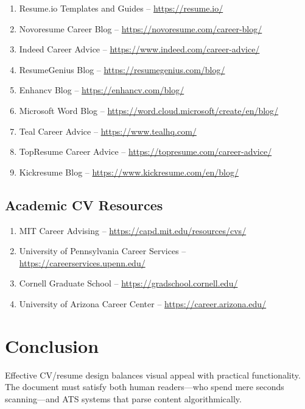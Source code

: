 \documentclass[11pt,a4paper]{article}
\begin{document}
\begin{enumerate}
    \item Resume.io Templates and Guides -- \url{https://resume.io/}
    \item Novoresume Career Blog -- \url{https://novoresume.com/career-blog/}
    \item Indeed Career Advice -- \url{https://www.indeed.com/career-advice/}
    \item ResumeGenius Blog -- \url{https://resumegenius.com/blog/}
    \item Enhancv Blog -- \url{https://enhancv.com/blog/}
    \item Microsoft Word Blog -- \url{https://word.cloud.microsoft/create/en/blog/}
    \item Teal Career Advice -- \url{https://www.tealhq.com/}
    \item TopResume Career Advice -- \url{https://topresume.com/career-advice/}
    \item Kickresume Blog -- \url{https://www.kickresume.com/en/blog/}
\end{enumerate}

\subsection{Academic CV Resources}

\begin{enumerate}
    \item MIT Career Advising -- \url{https://capd.mit.edu/resources/cvs/}
    \item University of Pennsylvania Career Services -- \url{https://careerservices.upenn.edu/}
    \item Cornell Graduate School -- \url{https://gradschool.cornell.edu/}
    \item University of Arizona Career Center -- \url{https://career.arizona.edu/}
\end{enumerate}

\section{Conclusion}

Effective CV/resume design balances visual appeal with practical functionality. The document must satisfy both human readers---who spend mere seconds scanning---and ATS systems that parse content algorithmically.
\end{document}
